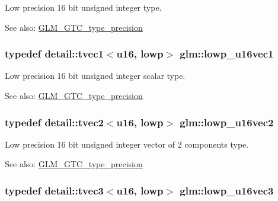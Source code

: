 Low precision 16 bit unsigned integer type. \begin{Desc}
\item[See also:]\hyperlink{group__gtc__type__precision}{GLM\_\-GTC\_\-type\_\-precision} \end{Desc}
\hypertarget{group__gtc__type__precision_g25464b09e8e3c63f6896605e0c997eb1}{
\subsubsection[lowp\_\-u16vec1]{\setlength{\rightskip}{0pt plus 5cm}typedef detail::tvec1$<$u16, lowp$>$ {\bf glm::lowp\_\-u16vec1}}}
\label{group__gtc__type__precision_g25464b09e8e3c63f6896605e0c997eb1}


Low precision 16 bit unsigned integer scalar type. \begin{Desc}
\item[See also:]\hyperlink{group__gtc__type__precision}{GLM\_\-GTC\_\-type\_\-precision} \end{Desc}
\hypertarget{group__gtc__type__precision_gff5ca5a8bc621bb8f4b28f046c0de508}{
\subsubsection[lowp\_\-u16vec2]{\setlength{\rightskip}{0pt plus 5cm}typedef detail::tvec2$<$u16, lowp$>$ {\bf glm::lowp\_\-u16vec2}}}
\label{group__gtc__type__precision_gff5ca5a8bc621bb8f4b28f046c0de508}


Low precision 16 bit unsigned integer vector of 2 components type. \begin{Desc}
\item[See also:]\hyperlink{group__gtc__type__precision}{GLM\_\-GTC\_\-type\_\-precision} \end{Desc}
\hypertarget{group__gtc__type__precision_g74d5491c9ee66d068309d200601e907b}{
\subsubsection[lowp\_\-u16vec3]{\setlength{\rightskip}{0pt plus 5cm}typedef detail::tvec3$<$u16, lowp$>$ {\bf glm::lowp\_\-u16vec3}}}
\label{group__gtc__type__precision_g74d5491c9ee66d068309d200601e907b}



